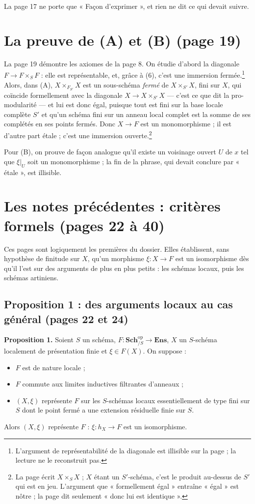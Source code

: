 \documentclass[11pt,a4paper]{article}
\begin{document}
La page 17 ne porte que « Façon d'exprimer », et rien ne dit ce qui devait
suivre.

\section*{La preuve de (A) et (B) (page 19)}

La page 19 démontre les axiomes de la page 8. On étudie d'abord la diagonale
$F \to F \times_S F$ : elle est représentable, et, grâce à (6), c'est une
immersion fermée.\footnote{L'argument de représentabilité de la diagonale
est illisible sur la page ; la lecture ne le reconstruit pas.} Alors, dans
(A), $X \times_{F_{S'}} X$ est un sous-schéma \emph{fermé} de $X
\times_{S'} X$, fini sur $X$, qui coïncide formellement avec la diagonale
$X \to X \times_{S'} X$ — c'est ce que dit la pro-modularité — et lui est
donc égal, puisque tout est fini sur la base locale complète $S'$ et qu'un
schéma fini sur un anneau local complet est la somme de ses complétés en ses
points fermés. Donc $X \to F$ est un monomorphisme ; il est d'autre part
étale ; c'est une immersion ouverte.\footnote{La page écrit $X \times_S X$ ;
$X$ étant un $S'$-schéma, c'est le produit au-dessus de $S'$ qui est en jeu.
L'argument que « formellement égal » entraîne « égal » est nôtre ; la page
dit seulement « donc lui est identique ».}

Pour (B), on prouve de façon analogue qu'il existe un voisinage ouvert $U$ de
$x$ tel que $\xi|_U$ soit un monomorphisme ; la fin de la phrase, qui devait
conclure par « étale », est illisible.

\section*{Les notes précédentes : critères formels (pages 22 à 40)}

Ces pages sont logiquement les premières du dossier. Elles établissent, sans
hypothèse de finitude sur $X$, qu'un morphisme $\xi : X \to F$ est un
isomorphisme dès qu'il l'est sur des arguments de plus en plus petits : les
schémas locaux, puis les schémas artiniens.

\subsection*{Proposition 1 : des arguments locaux au cas général (pages 22 et 24)}

\textbf{Proposition 1.} Soient $S$ un schéma, $F :
\mathbf{Sch}_{/S}^{\mathrm{op}} \to \mathbf{Ens}$, $X$ un $S$-schéma
localement de présentation finie et $\xi \in F(X)$. On suppose :
\begin{itemize}
\item[(L1)] $F$ est de nature locale ;
\item[(L2)] $F$ commute aux limites inductives filtrantes d'anneaux ;
\item[(R$_{\mathrm{loc}}$)] $(X, \xi)$ représente $F$ sur les $S$-schémas
locaux essentiellement de type fini sur $S$ dont le point fermé a une
extension résiduelle finie sur $S$.
\end{itemize}
Alors $(X, \xi)$ représente $F$ : $\xi : h_X \to F$ est un isomorphisme.
\end{document}
